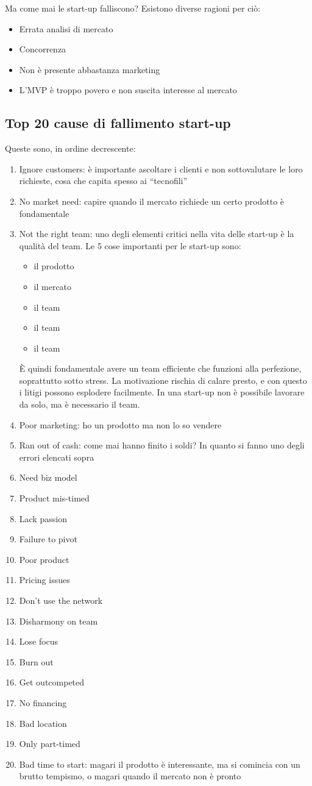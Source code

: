 Ma come mai le start-up falliscono? Esistono diverse ragioni per ciò:
\begin{itemize}
 \item Errata analisi di mercato
 \item Concorrenza
 \item Non è presente abbastanza marketing
 \item L'MVP è troppo povero e non suscita interesse al mercato
\end{itemize}

\subsection{Top 20 cause di fallimento start-up}

Queste sono, in ordine decrescente:
\begin{enumerate}
 \item Ignore customers: è importante ascoltare i clienti e non sottovalutare
le loro richieste, cosa che capita spesso ai ``tecnofili''
 \item No market need: capire quando il mercato richiede un certo prodotto è
fondamentale
 \item Not the right team: uno degli elementi critici nella vita delle
start-up è la qualità del team. Le 5 cose importanti per le start-up sono:
\begin{itemize}
 \item il prodotto
 \item il mercato
 \item il team
 \item il team
 \item il team
\end{itemize}
  È quindi fondamentale avere un team efficiente che funzioni alla perfezione,
soprattutto sotto stress. La motivazione rischia di calare presto, e con questo
i litigi possono esplodere facilmente. In una start-up non è possibile lavorare
da solo, ma è necessario il team.
 \item Poor marketing: ho un prodotto ma non lo so vendere
 \item Ran out of cash: come mai hanno finito i soldi? In quanto si fanno uno
degli errori elencati sopra
 \item Need biz model
 \item Product mis-timed
 \item Lack passion
 \item Failure to pivot
 \item Poor product
 \item Pricing issues
 \item Don't use the network
 \item Disharmony on team
 \item Lose focus
 \item Burn out
 \item Get outcompeted
 \item No financing
 \item Bad location
 \item Only part-timed
 \item Bad time to start: magari il prodotto è interessante, ma si comincia con
un brutto tempismo, o magari quando il mercato non è pronto
\end{enumerate}
